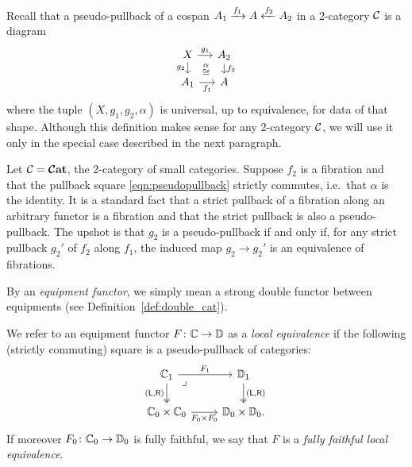 \documentclass[11pt,oneside,article]{memoir}
\begin{document}
Recall that a pseudo-pullback of a cospan $A_1\xrightarrow{f_1}A\xleftarrow{f_2}A_2$ in a 2-category $\mathcal{C}$ is a diagram
\begin{equation}
    \label{eqn:pseudopullback}
  \begin{tikzcd}[sep=small]
    X \ar[r,"g_1"] \ar[d,"g_2"'] \ar[rd,phantom,"\overset{\alpha}{\footnotesize\cong}"]
      & A_2 \ar[d,"f_2"] \\
    A_1 \ar[r,"f_1"']
      & A
  \end{tikzcd}
\end{equation}
where the tuple $(X,g_1,g_2,\alpha)$ is universal, up to equivalence, for data of that shape.
Although this definition makes sense for any 2-category $\mathcal{C}$, we will use it only in the
special case described in the next paragraph.

Let $\mathcal{C}=\bm{\mathcal{C}}\mathbf{at}$, the 2-category of small categories.  Suppose $f_2$ is a fibration and that the pullback square \eqref{eqn:pseudopullback}
strictly commutes, i.e.\ that $\alpha$ is the identity. It is a standard fact that a strict pullback
of a fibration along an arbitrary functor is a fibration and that the strict pullback
is also a pseudo-pullback. The upshot is that $g_2$ is a pseudo-pullback if and only if, for any
strict pullback $g_2'$ of $f_2$ along $f_1$, the induced map $g_2\to g_2'$ is an equivalence of
fibrations.

\begin{definition}
    \label{def:local_equivalence}
  By an \emph{equipment functor}, we simply mean a strong double functor between equipments (see Definition~\ref{def:double_cat}). 
  
  We refer to an equipment functor $F\colon\mathbb{C}\to\mathbb{D}$ as a \emph{local equivalence} if the
  following (strictly commuting) square is a pseudo-pullback of categories:
  \begin{equation} \begin{tikzcd}
      \label{eqn:local_equiv}
    \dcat{C}_1 \ar[r,"F_1"] \ar[d,two heads,"{(\lframe,\rframe)}"'] \ar[dr,phantom,"\lrcorner" very near start]
      & \dcat{D}_1 \ar[d,two heads,"{(\lframe,\rframe)}"] \\
    \dcat{C}_0\times\dcat{C}_0 \ar[r,"F_0\times F_0"']
      & \dcat{D}_0\times\dcat{D}_0.
  \end{tikzcd} \end{equation}
   If moreover $F_0\colon\mathbb{C}_0\to\mathbb{D}_0$ is fully faithful, we say that $F$ is a
   \emph{fully faithful local equivalence}.
\end{definition}
\end{document}

